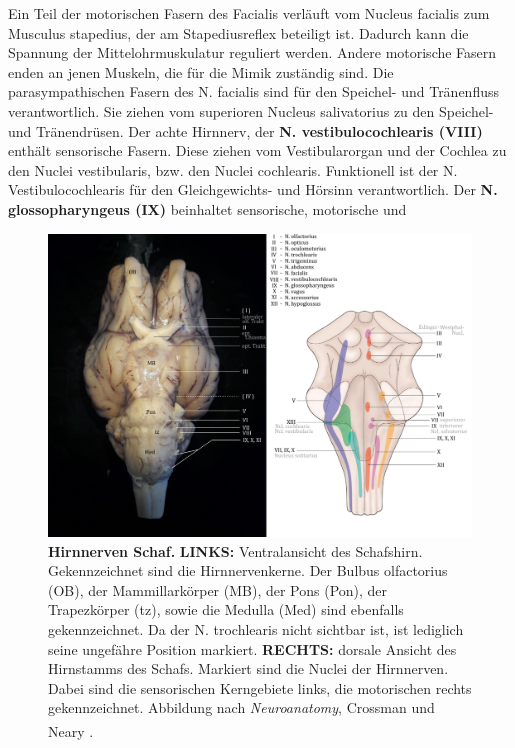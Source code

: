 \documentclass[12pt,a4paper,pdftex]{article}
\begin{document}
Ein Teil der motorischen Fasern des Facialis verläuft vom Nucleus facialis zum Musculus stapedius, der am Stapediusreflex beteiligt ist. Dadurch kann die Spannung der Mittelohrmuskulatur reguliert werden. Andere motorische Fasern enden an jenen Muskeln, die für die Mimik zuständig sind.  Die parasympathischen Fasern des N. facialis sind für den Speichel- und Tränenfluss verantwortlich. Sie ziehen vom superioren Nucleus salivatorius zu den Speichel- und Tränendrüsen. Der achte Hirnnerv, der \textbf{N. vestibulocochlearis (VIII)} enthält sensorische Fasern. Diese ziehen vom Vestibularorgan und der Cochlea zu den Nuclei vestibularis, bzw. den Nuclei cochlearis. Funktionell ist der N. Vestibulocochlearis für den Gleichgewichts- und Hörsinn verantwortlich. Der \textbf{N. glossopharyngeus (IX)} beinhaltet sensorische, motorische und 

\begin{figure}[H]
    \centering
    \includegraphics[width=\textwidth]{pictures/Bilder_Jule/Schaf/Aussenansicht/Hirnnerven.png}
    \caption[Hirnnerven Schaf]{\textbf{Hirnnerven Schaf.} \textbf{LINKS:} Ventralansicht des Schafshirn. Gekennzeichnet sind die Hirnnervenkerne. Der Bulbus olfactorius (OB), der Mammillarkörper (MB), der Pons (Pon), der Trapezkörper (tz), sowie die Medulla (Med) sind ebenfalls gekennzeichnet. Da der N. trochlearis nicht sichtbar ist, ist lediglich seine ungefähre Position markiert. \textbf{RECHTS:} dorsale Ansicht des Hirnstamms des Schafs. Markiert sind die Nuclei der Hirnnerven. Dabei sind die sensorischen Kerngebiete links, die motorischen rechts gekennzeichnet. Abbildung nach \textit{Neuroanatomy}, Crossman und Neary \textsuperscript{\cite[10]{crossman2014neuroanatomy}}.}
    \label{fig:hirnnerven_schaf}
\end{figure}{}
\end{document}
